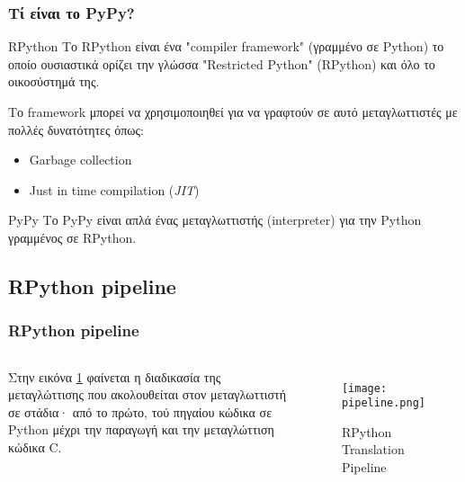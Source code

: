 \documentclass[greek]{beamer}
\begin{document}
\begin{frame}
\frametitle{Τί είναι το \textlatin{PyPy}?}

\begin{block}{\textlatin{RPython}}
Το \textlatin{RPython} είναι ένα "\textlatin{compiler framework}"
(γραμμένο σε \textlatin{Python}) το οποίο ουσιαστικά ορίζει την γλώσσα
\textlatin{"Restricted Python" (RPython)} και όλο το οικοσύστημά της.
\end{block}

Το \textlatin {framework} μπορεί να χρησιμοποιηθεί για να γραφτούν σε αυτό
μεταγλωττιστές με πολλές δυνατότητες όπως:

\begin{itemize}
	\item \textlatin{Garbage collection}
	\item \textlatin{Just in time compilation} (\textit{\textlatin{JIT}})
\end{itemize}

\begin{block}{\textlatin{PyPy}}
Το \textlatin{PyPy} είναι απλά ένας μεταγλωττιστής (\textlatin{interpreter})
για την \textlatin{Python} γραμμένος σε \textlatin{RPython}.
\end{block}

\end{frame}


\subsection{\textlatin{RPython pipeline}}

\begin{frame}
\frametitle{\textlatin{RPython pipeline}}

\begin{columns}[c] 


Στην εικόνα \ref{pipeline} φαίνεται η διαδικασία της μεταγλώττισης που
ακολουθείται στον μεταγλωττιστή σε στάδια· από το πρώτο, τού πηγαίου κώδικα σε
\textlatin{Python} μέχρι την παραγωγή και την μεταγλώττιση κώδικα \textlatin{C}.

\begin{figure}
\label{pipeline}
\caption{\textlatin{RPython Translation Pipeline}}
\texttt{[image: pipeline.png]}
\end{figure}

\end{columns}
\end{frame}
\end{document}
